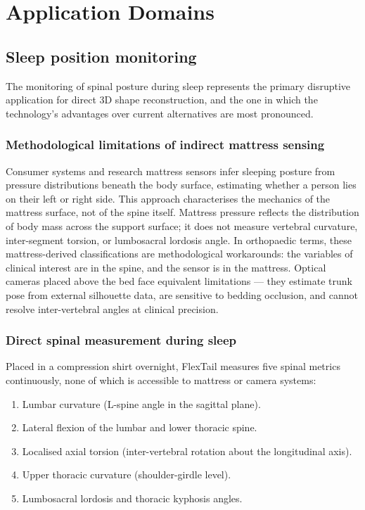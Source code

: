 \section{Application Domains}

\subsection{Sleep position monitoring}

The monitoring of spinal posture during sleep represents the primary disruptive
application for direct 3D shape reconstruction, and the one in which the technology's
advantages over current alternatives are most pronounced.

\subsubsection{Methodological limitations of indirect mattress sensing}

Consumer systems and research mattress sensors infer sleeping posture from pressure
distributions beneath the body surface, estimating whether a person lies on their left
or right side.
This approach characterises the mechanics of the mattress surface, not of the spine
itself.
Mattress pressure reflects the distribution of body mass across the support surface;
it does not measure vertebral curvature, inter-segment torsion, or lumbosacral
lordosis angle.
In orthopaedic terms, these mattress-derived classifications are methodological
workarounds: the variables of clinical interest are in the spine, and the sensor is
in the mattress.
Optical cameras placed above the bed face equivalent limitations --- they estimate
trunk pose from external silhouette data, are sensitive to bedding occlusion, and
cannot resolve inter-vertebral angles at clinical precision.

\subsubsection{Direct spinal measurement during sleep}

Placed in a compression shirt overnight, FlexTail measures five spinal metrics
continuously, none of which is accessible to mattress or camera systems:

\begin{enumerate}
	\item Lumbar curvature (L-spine angle in the sagittal plane).
	\item Lateral flexion of the lumbar and lower thoracic spine.
	\item Localised axial torsion (inter-vertebral rotation about the longitudinal axis).
	\item Upper thoracic curvature (shoulder-girdle level).
	\item Lumbosacral lordosis and thoracic kyphosis angles.
\end{enumerate}


